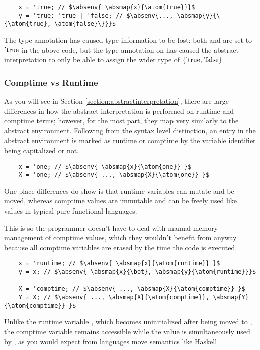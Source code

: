 \documentclass[12pt,twoside]{report}
\begin{document}
\begin{listing}[H]
  \begin{verbatim}
    x = 'true; // $\absenv{ \absmap{x}{\atom{true}}}$
    y = 'true: 'true | 'false; // $\absenv{..., \absmap{y}{\{\atom{true}, \atom{false}\}}}$
  \end{verbatim}
  \caption{The type annotation has caused type information to be lost: both  and  are set to $\atom{true}$ in the above code, but the type annotation on  has caused the abstract interpretation to only be able to assign the wider type of $\{ \atom{true}, \atom{false} \}$}
\end{listing}

\subsubsection{Comptime vs Runtime}
As you will see in Section \ref{section:abstractinterpretation}, there are large differences in how the abstract interpretation is performed on runtime and comptime terms; however, for the most part, they map very similarly to the abstract environment. Following from the syntax level distinction, an entry in the abstract environment is marked as runtime or comptime by the variable identifier being capitalized or not.

\begin{listing}[H]
  \begin{verbatim}
    x = 'one; // $\absenv{ \absmap{x}{\atom{one}} }$
    X = 'one; // $\absenv{ ..., \absmap{X}{\atom{one}} }$
  \end{verbatim}
\end{listing}

One place differences do show is that runtime variables can mutate and be moved, whereas comptime values are immutable and can be freely used like values in typical pure functional languages.

This is so the programmer doesn't have to deal with manual memory management of comptime values, which they wouldn't benefit from anyway because all comptime variables are erased by the time the code is executed.

\begin{listing}[H]
  \begin{verbatim}
    x = 'runtime; // $\absenv{ \absmap{x}{\atom{runtime}} }$
    y = x; // $\absenv{ \absmap{x}{\bot}, \absmap{y}{\atom{runtime}}}$
  
    X = 'comptime; // $\absenv{ ..., \absmap{X}{\atom{comptime}} }$
    Y = X; // $\absenv{ ..., \absmap{X}{\atom{comptime}}, \absmap{Y}{\atom{comptime}} }$
  \end{verbatim}
  \caption{Unlike the runtime variable , which becomes uninitialized after being moved to , the comptime variable  remains accessible while the value is simultaneously used by , as you would expect from languages move semantics like Haskell}
\end{listing}
\end{document}
